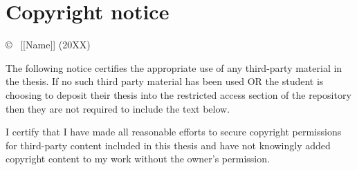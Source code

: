 \thispagestyle{empty}

\section*{Copyright notice}

\vspace{1cm}

{
  \copyright ~ [[Name]] (20XX)
}

\vspace{1cm}

{\color{blue}The following notice certifies the
appropriate use of any third-party material in the thesis. If no such third
party material has been used OR the student is choosing to deposit their thesis
into the restricted access section of the repository then they are not required
to include the text below.}

I certify that I have made all reasonable efforts to secure
copyright permissions for third-party content included in this
thesis and have not knowingly added copyright content to my work
without the owner's permission.
  
\clearpage


